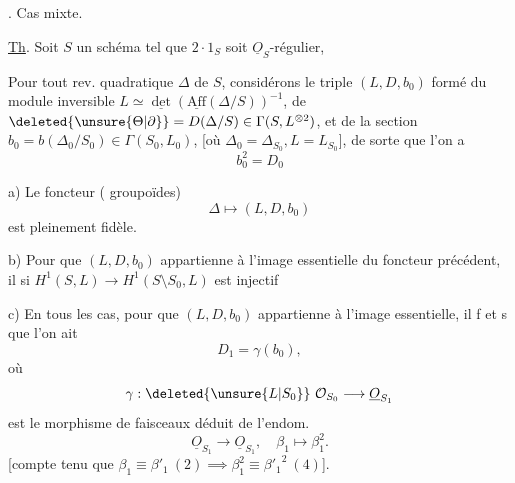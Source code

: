 . Cas mixte.

\uline{Th}.  Soit $S$ un schéma tel que $2\cdot1_S$ soit $\underline O_S$-régulier,  

Pour tout rev. quadratique $\Delta$ de $S$, considérons le triple $(L,D,b_0)$ formé du module inversible $L\simeq\underline{\det}(\underline{\mathrm{Aff}}(\Delta/S))^{-1}$, de $\deleted{\unsure{\Theta|\partial}}=D(\Delta/S)\in\Gamma(S,L^{\otimes2})$, et de la section $b_0=b(\Delta_0/S_0)\in\Gamma(S_0,L_0)$, [où $\Delta_0=\Delta_{S_0},L=L_{S_0}$], de sorte que l'on a
\[b_0^2=D_0\tag*{(8.1)}\]

a) Le foncteur (  groupoïdes)
\[\Delta\longmapsto(L,D,b_0)\]
est pleinement fidèle.

b)  Pour que  $(L,D,b_0)$ appartienne à l'image essentielle du foncteur précédent, il   si $H^1(S,L)\longrightarrow H^1(S\setminus S_0,L)$ est injectif   

c) En tous les cas, pour que $(L,D,b_0)$ appartienne à l'image essentielle, il f et s que l'on ait
\[D_1=\gamma(b_0),\]
où
\[\gamma:\deleted{\unsure{L|S_0}}\ \mathcal O_{S_0}\longrightarrow\underline O_{S_1}\]
est le morphisme de faisceaux  déduit de l'endom.
\[\underline O_{S_1}\longrightarrow\underline O_{S_1},\quad\beta_1\longmapsto\beta_1^2.\]
[compte tenu que $\beta_1\equiv\beta'_1\ (2)\implies\beta_1^2\equiv{\beta'_1}^2\ (4)$].

